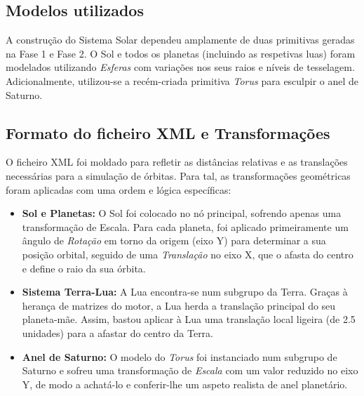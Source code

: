 \documentclass[12pt,a4paper]{article}
\begin{document}
\subsection{Modelos utilizados} 
A construção do Sistema Solar dependeu amplamente de duas primitivas geradas na Fase 1 e Fase 2. O Sol e todos os planetas (incluindo as respetivas luas) foram modelados utilizando \textit{Esferas} com variações nos seus raios e níveis de tesselagem. Adicionalmente, utilizou-se a recém-criada primitiva \textit{Torus} para esculpir o anel de Saturno.

\subsection{Formato do ficheiro XML e Transformações} 
O ficheiro XML foi moldado para refletir as distâncias relativas e as translações necessárias para a simulação de órbitas. Para tal, as transformações geométricas foram aplicadas com uma ordem e lógica específicas:
\begin{itemize}
    \item \textbf{Sol e Planetas:} O Sol foi colocado no nó principal, sofrendo apenas uma transformação de Escala. Para cada planeta, foi aplicado primeiramente um ângulo de \textit{Rotação} em torno da origem (eixo Y) para determinar a sua posição orbital, seguido de uma \textit{Translação} no eixo X, que o afasta do centro e define o raio da sua órbita.
    \item \textbf{Sistema Terra-Lua:} A Lua encontra-se num subgrupo da Terra. Graças à herança de matrizes do motor, a Lua herda a translação principal do seu planeta-mãe. Assim, bastou aplicar à Lua uma translação local ligeira (de 2.5 unidades) para a afastar do centro da Terra.
    \item \textbf{Anel de Saturno:} O modelo do \textit{Torus} foi instanciado num subgrupo de Saturno e sofreu uma transformação de \textit{Escala} com um valor reduzido no eixo Y, de modo a achatá-lo e conferir-lhe um aspeto realista de anel planetário.
\end{itemize}
\end{document}
